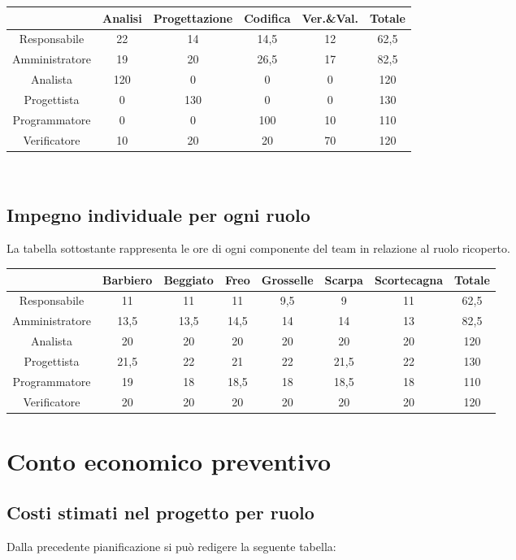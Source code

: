 \documentclass[11pt,a4paper]{article}
\begin{document}
\begin{tabular}{|c|c|c|c|c|c|}
\hline
 & Analisi & Progettazione & Codifica & Ver.\&Val. & Totale \\ \hline
Responsabile & 22 & 14 & 14,5 & 12 & 62,5 \\ \hline
Amministratore & 19 & 20 & 26,5 & 17 & 82,5 \\ \hline
Analista & 120 & 0 & 0 & 0 & 120 \\ \hline
Progettista & 0 & 130 & 0 & 0 & 130 \\ \hline
Programmatore & 0 & 0 & 100 & 10 & 110 \\ \hline
Verificatore & 10 & 20 & 20 & 70 & 120 \\ \hline
\end{tabular}
\\

\subsection{Impegno individuale per ogni ruolo}
La tabella sottostante rappresenta le ore di ogni componente del team in relazione al ruolo ricoperto.\\

\begin{tabular}{|c|c|c|c|c|c|c|c|}
\hline
 & Barbiero & Beggiato & Freo & Grosselle & Scarpa & Scortecagna & Totale \\ \hline
Responsabile & 11 & 11 & 11 & 9,5 & 9 & 11 & 62,5 \\ \hline
Amministratore & 13,5 & 13,5 & 14,5 & 14 & 14 & 13 & 82,5 \\ \hline
Analista & 20 & 20 & 20 & 20 & 20 & 20 & 120 \\ \hline
Progettista & 21,5 & 22 & 21 & 22 & 21,5 & 22 & 130 \\ \hline
Programmatore & 19 & 18 & 18,5 & 18 & 18,5 & 18 & 110 \\ \hline
Verificatore & 20 & 20 & 20 & 20 & 20 & 20 & 120 \\ \hline
\end{tabular}

\section{Conto economico preventivo}
\subsection{Costi stimati nel progetto per ruolo}
Dalla precedente pianificazione si può redigere la seguente tabella:\\
\end{document}
